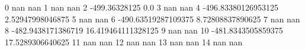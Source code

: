0 nan nan
1 nan nan
2 -499.36328125 0.0
3 nan nan
4 -496.83380126953125 2.52947998046875
5 nan nan
6 -490.63519287109375 8.72808837890625
7 nan nan
8 -482.9438171386719 16.419464111328125
9 nan nan
10 -481.8343505859375 17.5289306640625
11 nan nan
12 nan nan
13 nan nan
14 nan nan
